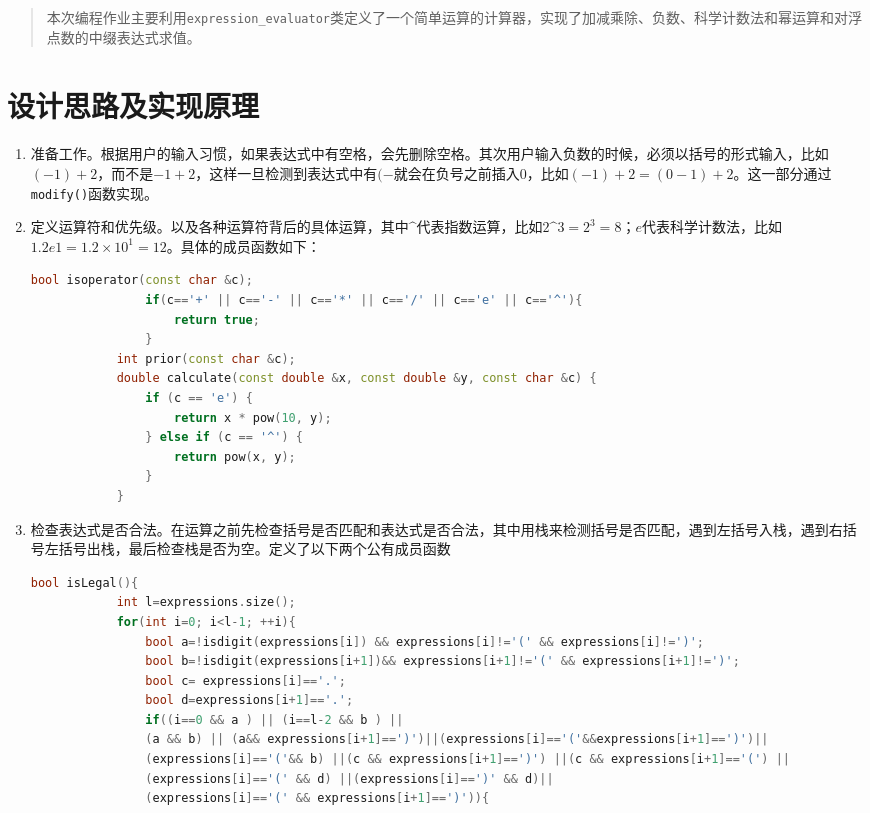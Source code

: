 \documentclass[UTF8]{ctexart}
\begin{document}
	
	\pagestyle{fancy}
	\fancyhead{}
	\rhead{\today}
	\begin{abstract}
		本次编程作业主要利用\texttt{expression\_evaluator}类定义了一个简单运算的计算器，实现了加减乘除、负数、科学计数法和幂运算和对浮点数的中缀表达式求值。
	\end{abstract}
	\section{设计思路及实现原理}
	\begin{enumerate}
		\item 准备工作。根据用户的输入习惯，如果表达式中有空格，会先删除空格。其次用户输入负数的时候，必须以括号的形式输入，比如$(-1)+2$，而不是$-1+2$，这样一旦检测到表达式中有$(-$就会在负号之前插入$0$，比如$(-1)+2=(0-1)+2$。这一部分通过\texttt{modify()}函数实现。
		\item 定义运算符和优先级。以及各种运算符背后的具体运算，其中$\^$代表指数运算，比如$2\^3=2^3=8$；$e$代表科学计数法，比如$1.2e1=1.2\times10^1=12$。具体的成员函数如下：
		\begin{lstlisting}[language=C++, caption={运算符实现}, label={lst:operators}]
			bool isoperator(const char &c);
				if(c=='+' || c=='-' || c=='*' || c=='/' || c=='e' || c=='^'){
					return true;
				}
			int prior(const char &c);
			double calculate(const double &x, const double &y, const char &c) {
				if (c == 'e') {
					return x * pow(10, y);
				} else if (c == '^') {
					return pow(x, y);
				}
			}
		\end{lstlisting}
		\item 检查表达式是否合法。在运算之前先检查括号是否匹配和表达式是否合法，其中用栈来检测括号是否匹配，遇到左括号入栈，遇到右括号左括号出栈，最后检查栈是否为空。定义了以下两个公有成员函数
		\begin{lstlisting}[language=C++, caption={运算符实现}, label={lst:operators}]
		    bool isLegal(){
			int l=expressions.size();
			for(int i=0; i<l-1; ++i){
				bool a=!isdigit(expressions[i]) && expressions[i]!='(' && expressions[i]!=')';
				bool b=!isdigit(expressions[i+1])&& expressions[i+1]!='(' && expressions[i+1]!=')';
				bool c= expressions[i]=='.';
				bool d=expressions[i+1]=='.';
				if((i==0 && a ) || (i==l-2 && b ) ||
				(a && b) || (a&& expressions[i+1]==')')||(expressions[i]=='('&&expressions[i+1]==')')||
				(expressions[i]=='('&& b) ||(c && expressions[i+1]==')') ||(c && expressions[i+1]=='(') ||
				(expressions[i]=='(' && d) ||(expressions[i]==')' && d)||
				(expressions[i]=='(' && expressions[i+1]==')')){

\end{lstlisting}
\end{enumerate}
\end{document}

